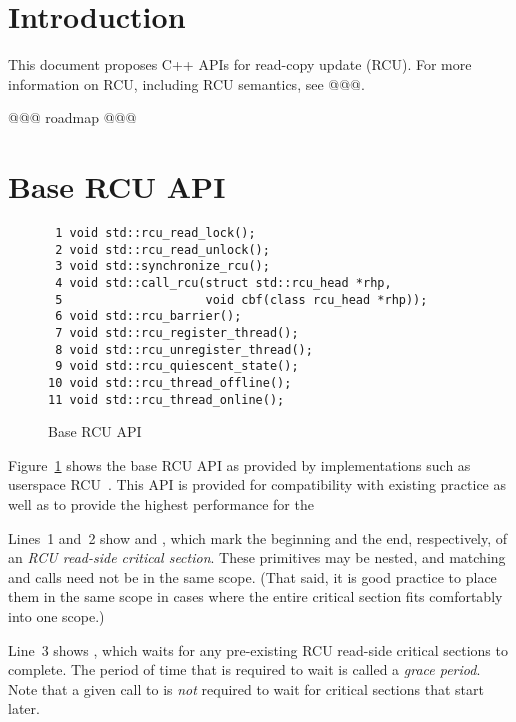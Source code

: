 \documentclass[letterpaper,twocolumn,10pt]{article}
\begin{document}
\section{Introduction}
\label{sec:Introduction}

This document proposes C++ APIs for read-copy update (RCU).
For more information on RCU, including RCU semantics, see @@@.

@@@ roadmap @@@

\section{Base RCU API}
\label{sec:Base RCU API}

\begin{figure}[tbp]
{ \scriptsize
\begin{verbatim}
 1 void std::rcu_read_lock();
 2 void std::rcu_read_unlock();
 3 void std::synchronize_rcu();
 4 void std::call_rcu(struct std::rcu_head *rhp,
 5                    void cbf(class rcu_head *rhp));
 6 void std::rcu_barrier();
 7 void std::rcu_register_thread();
 8 void std::rcu_unregister_thread();
 9 void std::rcu_quiescent_state();
10 void std::rcu_thread_offline();
11 void std::rcu_thread_online();
\end{verbatim}
}
\caption{Base RCU API}
\label{fig:Base RCU API}
\end{figure}

Figure~\ref{fig:Base RCU API}
shows the base RCU API as provided by implementations such as
userspace RCU~\cite{MathieuDesnoyers2009URCU,PaulMcKenney2013LWNURCU}.
This API is provided for compatibility with existing practice as
well as to provide the highest performance for the

Lines~1 and~2 show  and ,
which mark the beginning and the end, respectively, of an \emph{RCU read-side
critical section}.
These primitives may be nested, and matching 
and  calls need not be in the same scope.
(That said, it is good practice to place them in the same scope
in cases where the entire critical section fits comfortably into
one scope.)

Line~3 shows , which waits for any pre-existing
RCU read-side critical sections to complete.
The period of time that  is required to wait is
called a \emph{grace period}.
Note that a given call to  is \emph{not} required to
wait for critical sections that start later.
\end{document}
